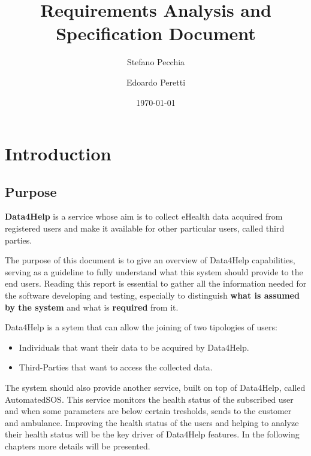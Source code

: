 \documentclass[a4paper,12pt]{article}
\title{Requirements Analysis and Specification Document}
\author{Stefano Pecchia \and Edoardo Peretti}
\date{\today}
\begin{document}
\begin{titlepage}
\maketitle
\end{titlepage}


\tableofcontents
\newpage
\section{Introduction}
\subsection{Purpose}

\textbf{Data4Help} is a service whose aim is to collect eHealth data acquired from registered users and make it available for other particular users, called third parties.

\par \noindent \newline
The purpose of this document is to give an overview of Data4Help capabilities, serving as a guideline to fully understand what this system should provide to the end users. Reading this report
is essential to gather all the information needed for the software developing and testing, especially to distinguish  \textbf{what is assumed by the system} and what is \textbf{required} from it.

\par \noindent \newline
Data4Help is a sytem that can allow the joining of two tipologies of users:
\begin{itemize}
\item Individuals that want their data to be acquired by Data4Help.
\item Third-Parties that want to access the collected data.
\end{itemize}
The system should also provide another service, built on top of Data4Help, called AutomatedSOS.
\newline
 This service monitors the health status of the subscribed user and when some parameters are below certain tresholds, sends to the customer and ambulance.
\newline
Improving the health status of the users and helping to analyze their health status will be the key driver of Data4Help features.
\newline
In the following chapters more details will be presented.
\end{document}
